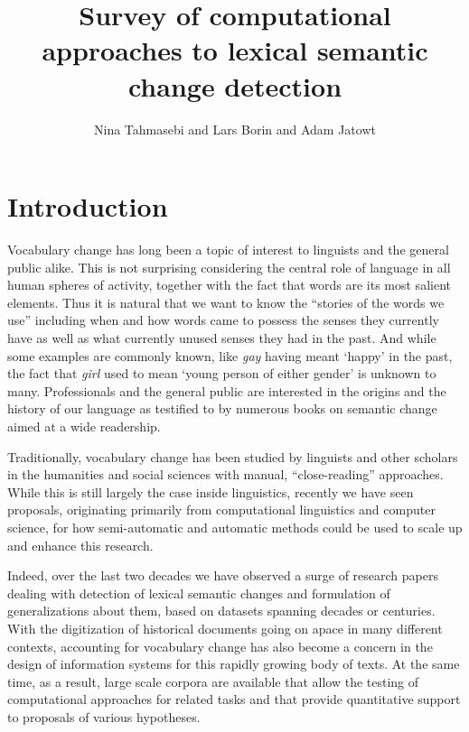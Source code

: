 \documentclass[output=paper]{langsci/langscibook}
\author{Nina Tahmasebi\affiliation{University of Gothenburg} and
Lars Borin\affiliation{University of Gothenburg} and
Adam Jatowt\affiliation{University of Innsbruck}}
\title{Survey of computational approaches to lexical semantic change detection}
\begin{document}
\maketitle

\section{Introduction}\label{sec:intro}

Vocabulary change has long been a topic of interest to linguists and the general public alike. This is not surprising  considering the central role of language in all human spheres of activity, together with the fact that words are its most salient elements. Thus it is natural that we want to know the ``stories of the words we use'' including when and how words came to possess the senses they currently have as well as what currently unused senses they had in the past. And while some examples are commonly known, like \textit{gay} having meant 
`happy' in the past, the fact that \textit{girl} used to mean `young person of either gender' is unknown to many. Professionals and the general public are interested in the origins and the history of our language as testified to by numerous books on semantic change aimed at a wide readership.

\begin{sloppypar}
Traditionally, vocabulary change has been studied by linguists and other scholars in the humanities and social sciences with manual, ``close-reading'' approaches. While this is still largely the case inside linguistics, recently we have seen proposals, originating primarily from computational linguistics and computer science, for how semi-automatic and automatic methods could be used to scale up and enhance this research.
\end{sloppypar}

Indeed, over the last two decades we have observed a surge of research papers dealing with detection of lexical semantic changes and formulation of generalizations about them, based on datasets spanning decades or centuries. With the digitization of historical documents going on apace in many different contexts, accounting for vocabulary change has also become a concern in the design of information systems for this rapidly growing body of texts. At the same time, as a result, large scale corpora are available that allow the testing of computational approaches for related tasks and that provide quantitative support to proposals of various hypotheses.\largerpage
\end{document}
